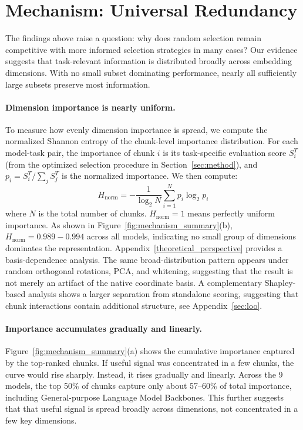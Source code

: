 \documentclass[11pt,a4paper]{article}
\begin{document}
\section{Mechanism: Universal Redundancy}

The findings above raise a question: why does random selection remain competitive with more informed selection strategies in many cases? Our evidence suggests that task-relevant information is distributed broadly across embedding dimensions. With no small subset dominating performance, nearly all sufficiently large subsets preserve most information.

\paragraph{Dimension importance is nearly uniform.}
To measure how evenly dimension importance is spread, we compute the normalized Shannon entropy of the chunk-level importance distribution. For each model-task pair, the importance of chunk $i$ is its task-specific evaluation score $S_i^T$ (from the optimized selection procedure in Section~\ref{sec:method}), and $p_i = S_i^T / \sum_j S_j^T$ is the normalized importance. We then compute:
\begin{equation}
H_{\text{norm}} = -\frac{1}{\log_2 N} \sum_{i=1}^{N} p_i \log_2 p_i
\end{equation}
where $N$ is the total number of chunks. $H_{\text{norm}} = 1$ means perfectly uniform importance. As shown in Figure~\ref{fig:mechanism_summary}(b), $H_{\text{norm}}=0.989-0.994$ across all models, indicating no small group of dimensions dominates the representation. Appendix~\ref{theoretical_perspective} provides a basis-dependence analysis. The same broad-distribution pattern appears under random orthogonal rotations, PCA, and whitening, suggesting that the result is not merely an artifact of the native coordinate basis. A complementary Shapley-based analysis shows a larger separation from standalone scoring, suggesting that chunk interactions contain additional structure, see Appendix~\ref{sec:loo}.

\paragraph{Importance accumulates gradually and linearly.}
Figure~\ref{fig:mechanism_summary}(a) shows the cumulative importance captured by the top-ranked chunks. If useful signal was concentrated in a few chunks, the curve would rise sharply. Instead, it rises gradually and linearly. Across the 9 models, the top 50\% of chunks capture only about 57--60\% of total importance, including General-purpose Language Model Backbones. This further suggests that that useful signal is spread broadly across dimensions, not concentrated in a few key dimensions.
\end{document}
